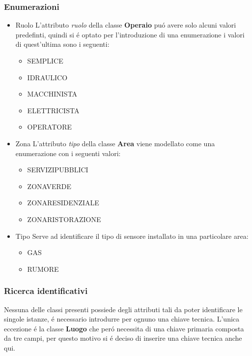 \documentclass[11pt]{article}
\begin{document}
\subsubsection*{Enumerazioni}
\label{sec:org7331311}
\begin{itemize}
\item Ruolo
\label{sec:org35a177e}
L'attributo \emph{ruolo} della classe \textbf{Operaio} puó avere solo alcuni valori predefinti, quindi si é optato per l'introduzione di una enumerazione i valori di quest'ultima sono i seguenti:
\begin{itemize}
\item SEMPLICE
\item IDRAULICO
\item MACCHINISTA
\item ELETTRICISTA
\item OPERATORE
\end{itemize}
\item Zona
\label{sec:orgb610cbd}
L'attributo \emph{tipo} della classe \textbf{Area} viene modellato come una enumerazione con i seguenti valori:
\begin{itemize}
\item SERVIZIPUBBLICI
\item ZONAVERDE
\item ZONARESIDENZIALE
\item ZONARISTORAZIONE
\end{itemize}
\item Tipo
\label{sec:org0ed9bd1}
Serve ad identificare il tipo di sensore installato in una particolare area:
\begin{itemize}
\item GAS
\item RUMORE
\end{itemize}
\end{itemize}
\subsubsection*{Ricerca identificativi}
\label{sec:orgd587be0}
Nessuna delle classi presenti possiede degli attributi tali da poter identificare le singole istanze, é necessario introdurre per ognuno una chiave tecnica.
L'unica eccezione é la classe \textbf{Luogo} che peró necessita di una chiave primaria composta da tre campi, per questo motivo si é deciso di inserire una chiave tecnica anche qui.
\end{document}
